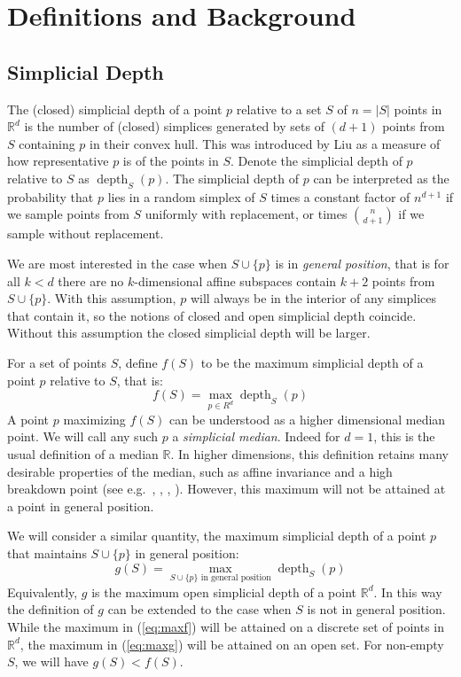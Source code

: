 \documentclass[epsbox,12pt,reqno]{amsart}
\theoremstyle{definition}
\theoremstyle{remark}
\def\sd{\operatorname{depth}}
\def\R{\mathbb{R}}
\begin{document}
%
%
\section{Definitions and Background}\label{se:defs}

\subsection{Simplicial Depth}\label{se:depth}
The (closed) simplicial depth of a point $p$ relative to a set 
$S$ of $n=|S|$ points in ${\R}^d$ is the number of (closed) simplices
generated by sets of $(d+1)$ points from $S$ containing $p$ 
in their convex hull.
This was introduced by Liu \cite{Liu90} as a measure of how 
representative $p$ is of the points in $S$.
Denote the simplicial depth of $p$ relative to $S$ as $\sd_S(p)$.
The simplicial depth of $p$ can be interpreted
as the probability that $p$ lies in a random simplex of $S$ 
times a constant factor of $n^{d+1}$ if we sample points from $S$
uniformly with replacement, or times $\binom{n}{d+1}$ if we 
sample without replacement.

We are most interested in the case when $S \cup \{p\}$ is in 
{\it general position}, that is for all $k < d$ there are 
no $k$-dimensional affine 
subspaces contain $k+2$ points from $S \cup \{p\}$.
With this assumption, $p$ will always be in the
interior of any simplices that contain it, so the notions of closed 
and open simplicial depth coincide.  
Without this assumption the closed simplicial depth will be larger.

For a set of points $S$, define $f(S)$ to be the maximum simplicial
depth of a point $p$ relative to $S$, that is:
\begin{equation}\label{eq:maxf}
f(S) = \max_{p \in R^d} \sd_S(p)
\end{equation}
A point $p$ maximizing $f(S)$ can be understood as a 
higher dimensional median point.  We will call any such $p$
a {\it simplicial median}.  Indeed for $d=1$, this is the
usual definition of a median ${\R}$. In higher dimensions,
this definition retains many
desirable properties of the median, such as affine
invariance and a high breakdown point (see e.g.~\cite{Alo05}, 
\cite{FR05}, \cite{GSW92}, \cite{Liu90}).
However, this maximum will not be attained at a point in general position.

We will consider a similar quantity, the maximum simplicial
depth of a point $p$ that maintains $S \cup \{p\}$ 
in general position:
\begin{equation}\label{eq:maxg}
g(S) = \max_{S \cup \{p\} \text{ in general position}} \sd_S(p)
\end{equation}
Equivalently, $g$ is the maximum open simplicial depth of a point
${\R}^d$.  In this way the definition of $g$ can be extended to 
the case when $S$ is not in general position.
While the maximum in (\ref{eq:maxf}) will be 
attained on a discrete set of points in ${\R}^d$, the
maximum in (\ref{eq:maxg}) will be attained on an open set.
For non-empty $S$, we will have $g(S)<f(S)$.
\end{document}
